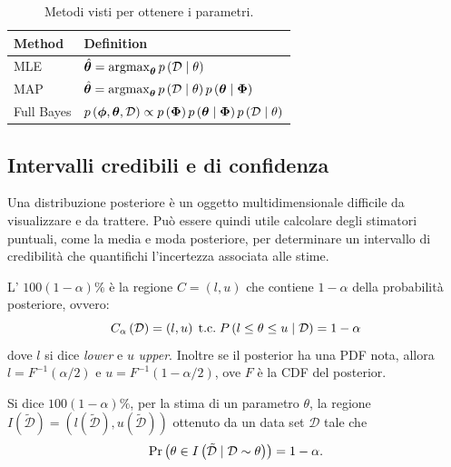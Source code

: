\documentclass[10pt]{article}
\DeclareMathOperator{\pr}{Pr}
\begin{document}
    \begin{table}[]
        \centering\begin{tabular}{ll}
            \toprule
            Method & Definition \\
            \midrule
            MLE & \( \hat{\bm{\theta}} = \operatorname*{argmax}_{\bm{\theta}} p \left( \mathcal{D}\mid \theta \right) \) \\
            MAP & \( \hat{\bm{\theta}} = \operatorname*{argmax}_{\bm{\theta}} p \left( \mathcal{D}\mid \theta \right) p \left( \bm{\theta} \mid \bm{\Phi} \right)\) \\
            Full Bayes & \( p \left( \bm{\phi}, \bm{\theta}, \mathcal{D} \right) \propto p \left( \bm{\Phi} \right) p \left( \bm{\theta} \mid \bm{\Phi}\right) p \left( \mathcal{D} \mid \theta \right) \) \\
            \bottomrule
        \end{tabular}
        \caption{Metodi visti per ottenere i parametri.}\label{tab:metodi-parametri}
    \end{table}

\subsection{Intervalli credibili e di confidenza}
    Una distribuzione posteriore è un oggetto multidimensionale difficile da
    visualizzare e da trattere. Può essere quindi utile calcolare degli
    stimatori puntuali, come la media e moda posteriore, per determinare un
    intervallo di credibilità che quantifichi l'incertezza associata alle stime.

    \begin{definition}
        L' \( 100\left( 1 - \alpha \right)\% \) è la regione \(C = \left( l, u \right)\)
        che contiene \( 1 - \alpha \) della probabilità posteriore, ovvero:
        \begin{equation}
            C_\alpha \left( \mathcal{D} \right) = \left( l, u \right) \;\text{t.c.}\; P\left( l \leq \theta \leq u \mid \mathcal{D} \right) = 1 - \alpha
        \end{equation}
        dove \(l\) si dice \textit{lower} e \(u\) \textit{upper}. Inoltre se il posterior
        ha una PDF nota, allora \(l = F^{-1} \left( \alpha/2 \right) \) e \( u = F^{-1} \left( 1 - \alpha/2 \right)\),
        ove \(F\) è la CDF del posterior.
    \end{definition}

    \begin{definition}
        Si dice  \(100 \left( 1 - \alpha \right)\% \), per la stima di un
        parametro \( \theta \), la regione \(I ( \tilde{\mathcal{D}} ) = ( l( \mathcal{\tilde{D}} ), u( \mathcal{\tilde{D}} ) )\)
        ottenuto da un data set \(\mathcal{D}\) tale che
        \begin{equation}
            \pr \left( \theta \in I \left( \mathcal{\tilde{D}} \cond \mathcal{D} \sim \theta \right) \right) = 1 - \alpha.
        \end{equation}

    \end{definition}
\end{document}
